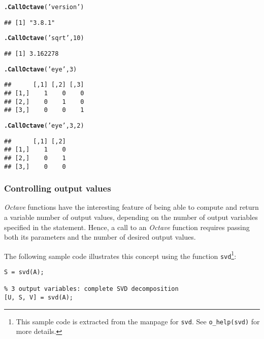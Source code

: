 \documentclass[english,10pt,a4paper]{article}\usepackage[]{graphicx}\usepackage[]{color}
\makeatletter
\newcommand{\hlnum}[1]{\textcolor[rgb]{0.686,0.059,0.569}{#1}}%
\newcommand{\hlstr}[1]{\textcolor[rgb]{0.192,0.494,0.8}{#1}}%
\newcommand{\hlstd}[1]{\textcolor[rgb]{0.345,0.345,0.345}{#1}}%
\newcommand{\hlkwd}[1]{\textcolor[rgb]{0.737,0.353,0.396}{\textbf{#1}}}%
\newenvironment{kframe}{%
 \def\at@end@of@kframe{}%
 \ifinner\ifhmode%
  \def\at@end@of@kframe{\end{minipage}}%
  \begin{minipage}{\columnwidth}%
 \fi\fi%
 \def\FrameCommand##1{\hskip\@totalleftmargin \hskip-\fboxsep
 \colorbox{shadecolor}{##1}\hskip-\fboxsep
     \hskip-\linewidth \hskip-\@totalleftmargin \hskip\columnwidth}%
 \MakeFramed {\advance\hsize-\width
   \@totalleftmargin\z@ \linewidth\hsize
   \@setminipage}}%
 {\par\unskip\endMakeFramed%
 \at@end@of@kframe}
\newenvironment{knitrout}{}{} %
\let\proglang=\textit
\let\code=\texttt
\newcommand{\octave}{\proglang{Octave}\xspace}
\makeatother
\begin{document}
\begin{knitrout}
\color{fgcolor}\begin{kframe}
\begin{alltt}
\hlkwd{.CallOctave}\hlstd{(}\hlstr{'version'}\hlstd{)}
\end{alltt}
\begin{verbatim}
## [1] "3.8.1"
\end{verbatim}
\begin{alltt}
\hlkwd{.CallOctave}\hlstd{(}\hlstr{'sqrt'}\hlstd{,} \hlnum{10}\hlstd{)}
\end{alltt}
\begin{verbatim}
## [1] 3.162278
\end{verbatim}
\begin{alltt}
\hlkwd{.CallOctave}\hlstd{(}\hlstr{'eye'}\hlstd{,} \hlnum{3}\hlstd{)}
\end{alltt}
\begin{verbatim}
##      [,1] [,2] [,3]
## [1,]    1    0    0
## [2,]    0    1    0
## [3,]    0    0    1
\end{verbatim}
\begin{alltt}
\hlkwd{.CallOctave}\hlstd{(}\hlstr{'eye'}\hlstd{,} \hlnum{3}\hlstd{,} \hlnum{2}\hlstd{)}
\end{alltt}
\begin{verbatim}
##      [,1] [,2]
## [1,]    1    0
## [2,]    0    1
## [3,]    0    0
\end{verbatim}
\end{kframe}
\end{knitrout}

\subsubsection{Controlling output values}
\label{sec:argout}

\octave functions have the interesting feature of being able to compute
and return a variable number of output values, depending on the number of output
variables specified in the statement.
Hence, a call to an \octave function requires passing both its parameters and
the number of desired output values.

The following sample code illustrates this concept using the function
\code{svd}\footnote{This sample code is extracted from the manpage for
\code{svd}. See \code{o\_help(svd)} for more details.}:

\begin{Verbatim}[frame=single]
% single output variable: eigen values only
S = svd(A);

% 3 output variables: complete SVD decomposition  
[U, S, V] = svd(A);
\end{Verbatim}
\end{document}
